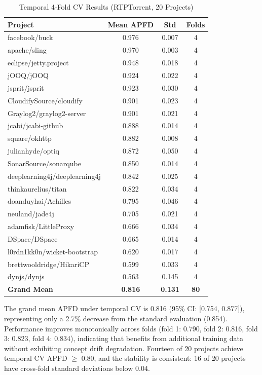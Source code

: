 \begin{table}[!t]
\centering
\caption{Temporal 4-Fold CV Results (RTPTorrent, 20 Projects)}
\label{tab:temporal_cv_rtptorrent}
\footnotesize
\begin{tabular}{lccc}
\toprule
\textbf{Project} & \textbf{Mean APFD} & \textbf{Std} & \textbf{Folds} \\
\midrule
facebook/buck & 0.976 & 0.007 & 4 \\
apache/sling & 0.970 & 0.003 & 4 \\
eclipse/jetty.project & 0.948 & 0.018 & 4 \\
jOOQ/jOOQ & 0.924 & 0.022 & 4 \\
jsprit/jsprit & 0.923 & 0.030 & 4 \\
CloudifySource/cloudify & 0.901 & 0.023 & 4 \\
Graylog2/graylog2-server & 0.901 & 0.021 & 4 \\
jcabi/jcabi-github & 0.888 & 0.014 & 4 \\
square/okhttp & 0.882 & 0.008 & 4 \\
julianhyde/optiq & 0.872 & 0.050 & 4 \\
SonarSource/sonarqube & 0.850 & 0.014 & 4 \\
deeplearning4j/deeplearning4j & 0.842 & 0.025 & 4 \\
thinkaurelius/titan & 0.822 & 0.034 & 4 \\
doanduyhai/Achilles & 0.795 & 0.046 & 4 \\
neuland/jade4j & 0.705 & 0.021 & 4 \\
adamfisk/LittleProxy & 0.666 & 0.034 & 4 \\
DSpace/DSpace & 0.665 & 0.014 & 4 \\
l0rdn1kk0n/wicket-bootstrap & 0.620 & 0.017 & 4 \\
brettwooldridge/HikariCP & 0.599 & 0.033 & 4 \\
dynjs/dynjs & 0.563 & 0.145 & 4 \\
\midrule
\textbf{Grand Mean} & \textbf{0.816} & \textbf{0.131} & \textbf{80} \\
\bottomrule
\end{tabular}
\end{table}

The grand mean APFD under temporal CV is 0.816 (95\% CI: [0.754, 0.877]),
representing only a 2.7\% decrease from the standard evaluation (0.854).
Performance improves monotonically across folds (fold 1: 0.790, fold 2: 0.816,
fold 3: 0.823, fold 4: 0.834), indicating that \filopriori{} benefits from
additional training data without exhibiting concept drift degradation.
Fourteen of 20 projects achieve temporal CV APFD $\geq$ 0.80, and the
stability is consistent: 16 of 20 projects have cross-fold standard deviations
below 0.04.

